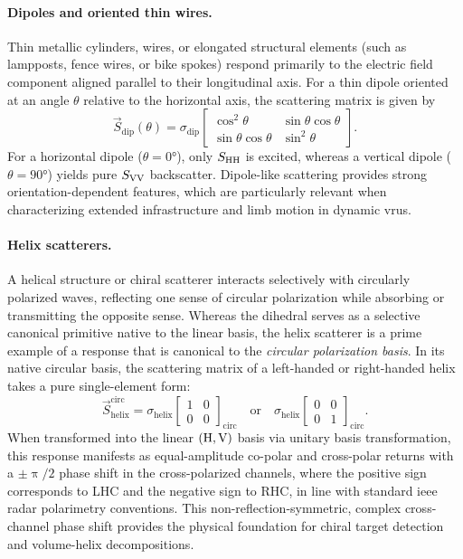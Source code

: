 \paragraph{Dipoles and oriented thin wires.}
Thin metallic cylinders, wires, or elongated structural elements (such as lampposts, fence wires, or bike spokes) respond primarily to the electric field component aligned parallel to their longitudinal axis.
For a thin dipole oriented at an angle $\theta$ relative to the horizontal axis, the scattering matrix is given by
\begin{equation}
    \label{eq:canonical-dipole}
    \vec S_{\text{dip}}(\theta) = \sigma_{\text{dip}} \begin{bmatrix} \cos^2\theta & \sin\theta\cos\theta \\ \sin\theta\cos\theta & \sin^2\theta \end{bmatrix}.
\end{equation}
For a horizontal dipole ($\theta = \ang{0}$), only $S_{\mathrm{HH}}$ is excited, whereas a vertical dipole ($\theta = \ang{90}$) yields pure $S_{\mathrm{VV}}$ backscatter.
Dipole-like scattering provides strong orientation-dependent features, which are particularly relevant when characterizing extended infrastructure and limb motion in dynamic \glspl{vru}.

\paragraph{Helix scatterers.}
A helical structure or chiral scatterer interacts selectively with circularly polarized waves, reflecting one sense of circular polarization while absorbing or transmitting the opposite sense.
Whereas the dihedral serves as a selective canonical primitive native to the linear basis, the helix scatterer is a prime example of a response that is canonical to the \emph{circular polarization basis}.
In its native circular basis, the scattering matrix of a left-handed or right-handed helix takes a pure single-element form:
\begin{equation}
    \label{eq:canonical-helix-circ}
    \vec S_{\text{helix}}^{\text{circ}} = \sigma_{\text{helix}} \begin{bmatrix} 1 & 0 \\ 0 & 0 \end{bmatrix}_{\text{circ}} \quad \text{or} \quad \sigma_{\text{helix}} \begin{bmatrix} 0 & 0 \\ 0 & 1 \end{bmatrix}_{\text{circ}}.
\end{equation}
When transformed into the linear $(\mathrm{H}, \mathrm{V})$ basis via unitary basis transformation, this response manifests as equal-amplitude co-polar and cross-polar returns with a $\pm \uppi/2$ phase shift in the cross-polarized channels, where the positive sign corresponds to LHC and the negative sign to RHC, in line with standard \gls{ieee} radar polarimetry conventions.
This non-reflection-symmetric, complex cross-channel phase shift provides the physical foundation for chiral target detection and volume-helix decompositions.

